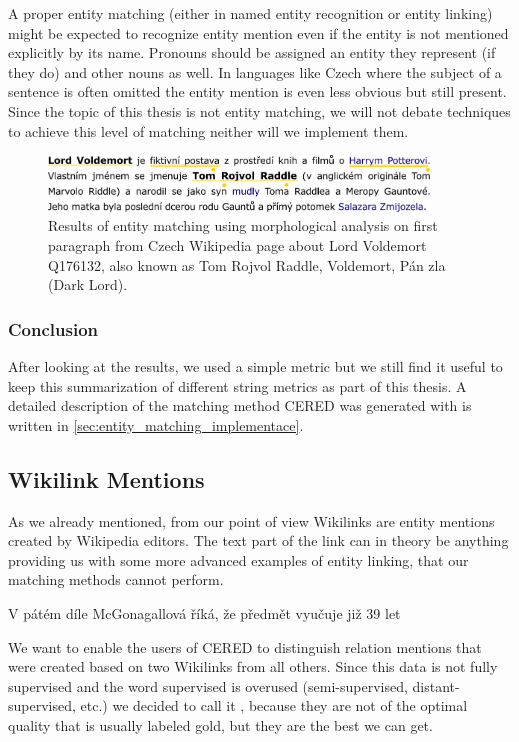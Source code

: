 
A proper entity matching (either in named entity recognition or entity linking) might be expected to recognize entity mention even if the entity is not mentioned explicitly by its name. Pronouns should be assigned an entity they represent (if they do) and other nouns as well. In languages like Czech where the subject of a sentence is often omitted the entity mention is even less obvious but still present. Since the topic of this thesis is not entity matching, we will not debate techniques to achieve this level of matching neither will we implement them.


\begin{figure}
\centering
\includegraphics[width = 0.9\textwidth]{./img/Voldemort_lexical}

\caption{Results of entity matching using morphological analysis on first paragraph from Czech Wikipedia page about Lord Voldemort Q176132, also known as Tom Rojvol Raddle, Voldemort, Pán zla (Dark Lord). }

\end{figure}


\subsubsection{Conclusion}
After looking at the results, we used a simple metric but we still find it useful to keep this summarization of different string metrics as part of this thesis. A detailed description of the matching method CERED was generated with is written in \autoref{sec:entity_matching_implementace}.

\subsection{Wikilink Mentions}

As we already mentioned, from our point of view Wikilinks are entity mentions created by Wikipedia editors. The text part of the link can in theory be anything providing us with some more advanced examples of entity linking, that our matching methods cannot perform.

V pátém díle McGonagallová říká, že předmět vyučuje již 39 let

We want to enable the users of CERED to distinguish relation mentions that were created based on two Wikilinks from all others. Since this data is not fully supervised and the word supervised is overused (semi-supervised, distant-supervised, etc.) we decided to call it , because they are not of the optimal quality that is usually labeled gold, but they are the best we can get.


